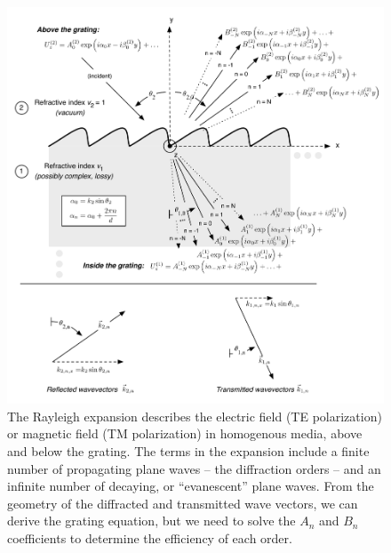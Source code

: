 \begin{figure}[htbp] %
   \centering
   \includegraphics[scale=0.8]{../data/Chapter2/2b_rayleighExpansion/2b.pdf} 
   \caption{The Rayleigh expansion describes the electric field (TE polarization) or magnetic field (TM polarization) in homogenous media, above and below the grating.  The terms in the expansion include a finite number of propagating plane waves -- the diffraction orders -- and an infinite number of decaying, or ``evanescent'' plane waves. From the geometry of the diffracted and transmitted wave vectors, we can derive the grating equation, but we need to solve the $A_n$ and $B_n$ coefficients to determine the efficiency of each order. }
   \label{2b}
\end{figure}

